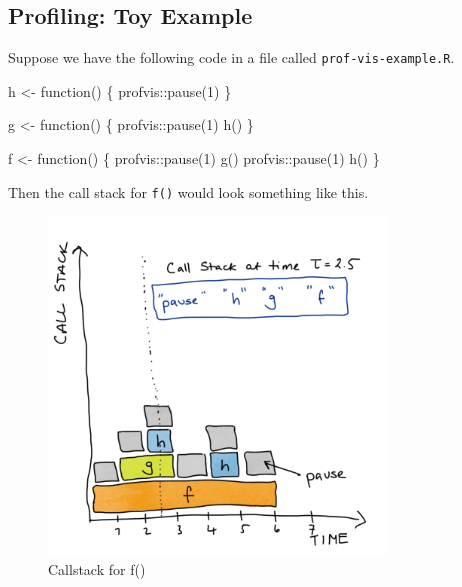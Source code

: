 \documentclass[
  letterpaper,
  DIV=11,
  numbers=noendperiod]{scrreprt}
\newenvironment{Shaded}{\begin{snugshade}}{\end{snugshade}}
\newcommand{\ControlFlowTok}[1]{\textcolor[rgb]{0.00,0.23,0.31}{#1}}
\newcommand{\DecValTok}[1]{\textcolor[rgb]{0.68,0.00,0.00}{#1}}
\newcommand{\FunctionTok}[1]{\textcolor[rgb]{0.28,0.35,0.67}{#1}}
\newcommand{\NormalTok}[1]{\textcolor[rgb]{0.00,0.23,0.31}{#1}}
\newcommand{\OtherTok}[1]{\textcolor[rgb]{0.00,0.23,0.31}{#1}}
\newcommand{\SpecialCharTok}[1]{\textcolor[rgb]{0.37,0.37,0.37}{#1}}
\begin{document}
\subsection{Profiling: Toy Example}\label{profiling-toy-example}

Suppose we have the following code in a file called
\texttt{prof-vis-example.R}.

\begin{Shaded}
\begin{Highlighting}[]
\NormalTok{h }\OtherTok{\textless{}{-}} \ControlFlowTok{function}\NormalTok{() \{}
\NormalTok{  profvis}\SpecialCharTok{::}\FunctionTok{pause}\NormalTok{(}\DecValTok{1}\NormalTok{)}
\NormalTok{\}}

\NormalTok{g }\OtherTok{\textless{}{-}} \ControlFlowTok{function}\NormalTok{() \{}
\NormalTok{  profvis}\SpecialCharTok{::}\FunctionTok{pause}\NormalTok{(}\DecValTok{1}\NormalTok{)}
  \FunctionTok{h}\NormalTok{()}
\NormalTok{\}}

\NormalTok{f }\OtherTok{\textless{}{-}} \ControlFlowTok{function}\NormalTok{() \{}
\NormalTok{  profvis}\SpecialCharTok{::}\FunctionTok{pause}\NormalTok{(}\DecValTok{1}\NormalTok{)}
  \FunctionTok{g}\NormalTok{()}
\NormalTok{  profvis}\SpecialCharTok{::}\FunctionTok{pause}\NormalTok{(}\DecValTok{1}\NormalTok{)}
  \FunctionTok{h}\NormalTok{()}
\NormalTok{\}}
\end{Highlighting}
\end{Shaded}

Then the call stack for \texttt{f()} would look something like this.

\begin{figure}[H]

{\centering \includegraphics[width=0.8\textwidth,height=\textheight]{images/403-production-scalability/call-stack.png}

}

\caption{Callstack for f()}

\end{figure}%
\end{document}
